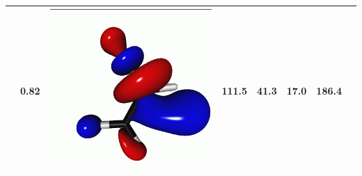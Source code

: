 \documentclass[journal=jctcce,manuscript=article]{achemso}
\begin{document}
\begin{table}[H]
\begin{tabular}{ c | c c c | c c c c}
\begin{minipage}{0.2\textwidth}
     \end{minipage}
     & 0.82
     &  \begin{minipage}{0.2\textwidth}
         \centering
         \includegraphics[scale=0.10]{NTO/CH2CHF/11p.png}
     \end{minipage}
     & 111.5 & 41.3 & 17.0 & 186.4
     \\
     \hline
 \end{tabular}
 \end{table}
%
\end{document}
